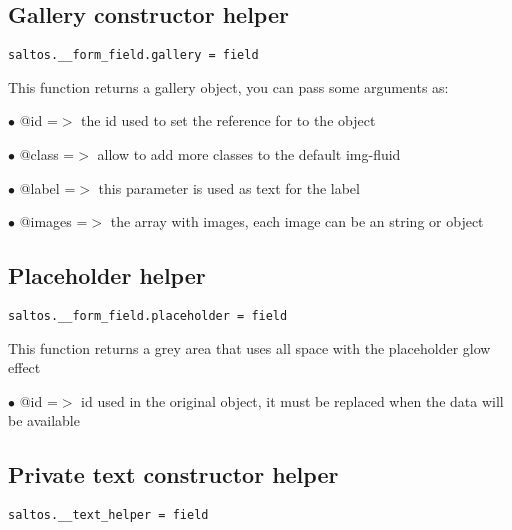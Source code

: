 \documentclass[a4paper]{book}
\begin{document}
\hypertarget{toc403}{}
\subsection{Gallery constructor helper}

\begin{lstlisting}
saltos.__form_field.gallery = field
\end{lstlisting}

This function returns a gallery object, you can pass some arguments as:

\begin{compactitem}
\item[\color{myblue}$\bullet$] @id     =$>$ the id used to set the reference for to the object
\item[\color{myblue}$\bullet$] @class  =$>$ allow to add more classes to the default img-fluid
\item[\color{myblue}$\bullet$] @label  =$>$ this parameter is used as text for the label
\item[\color{myblue}$\bullet$] @images =$>$ the array with images, each image can be an string or object
\end{compactitem}

\hypertarget{toc404}{}
\subsection{Placeholder helper}

\begin{lstlisting}
saltos.__form_field.placeholder = field
\end{lstlisting}

This function returns a grey area that uses all space with the placeholder glow effect

\begin{compactitem}
\item[\color{myblue}$\bullet$] @id =$>$ id used in the original object, it must be replaced when the data will be available
\end{compactitem}

\hypertarget{toc405}{}
\subsection{Private text constructor helper}

\begin{lstlisting}
saltos.__text_helper = field
\end{lstlisting}
\end{document}
